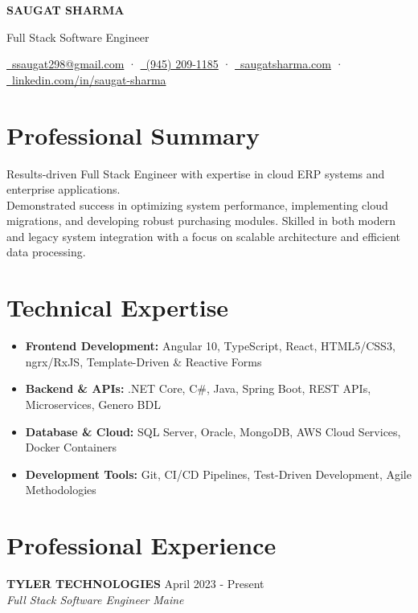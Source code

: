 \documentclass[11pt,letterpaper]{article}
\begin{document}
\begin{center}
    {\LARGE\bfseries\color{sectioncolor} SAUGAT SHARMA}

    \vspace{0.2em}
    {\Large\color{sectioncolor} Full Stack Software Engineer}

    \vspace{0.2em}
    {\color{linkcolor}
        \href{mailto:ssaugat298@gmail.com}{\faEnvelope\ ssaugat298@gmail.com} 
        · \href{tel:+19452091185}{\faPhone\ (945) 209-1185} 
        · \href{https://saugatsharma.com}{\faGlobe\ saugatsharma.com} 
        · \href{https://linkedin.com/in/saugat-sharma}{\faLinkedin\ linkedin.com/in/saugat-sharma}
    }
\end{center}

\section{Professional Summary}
\qquad Results-driven Full Stack Engineer with expertise in cloud ERP systems and enterprise applications.\\ Demonstrated success in optimizing system performance, implementing cloud migrations, and developing robust purchasing modules. Skilled in both modern and legacy system integration with a focus on scalable architecture and efficient data processing.

\section{Technical Expertise}
\begin{itemize}
    \item \textbf{Frontend Development:} Angular 10, TypeScript, React, HTML5/CSS3, ngrx/RxJS, Template-Driven \& Reactive Forms
    \item \textbf{Backend \& APIs:} .NET Core, C\#, Java, Spring Boot, REST APIs, Microservices, Genero BDL
    \item \textbf{Database \& Cloud:} SQL Server, Oracle, MongoDB, AWS Cloud Services, Docker Containers
    \item \textbf{Development Tools:} Git, CI/CD Pipelines, Test-Driven Development, Agile Methodologies
\end{itemize}

\section{Professional Experience}
\noindent\textbf{\large\color{sectioncolor} TYLER TECHNOLOGIES } \hfill{\color{datecolor} April 2023 - Present}\\
\textit{Full Stack Software Engineer} \hfill \textit{Maine}
\end{document}
